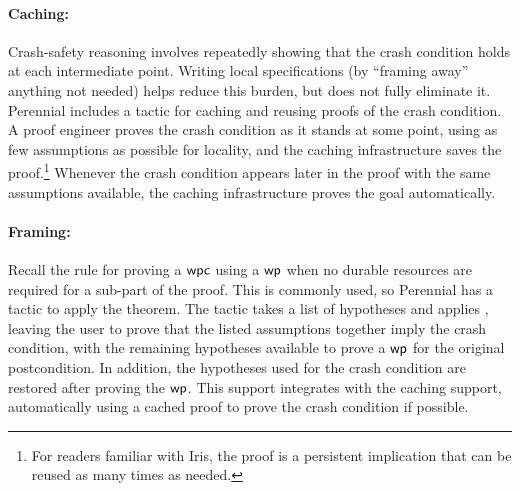 \paragraph{Caching:} Crash-safety reasoning involves repeatedly showing
that the crash condition holds at each intermediate point.
Writing local specifications (by ``framing away'' anything not needed)
helps reduce this burden, but does not fully eliminate it.
Perennial includes a tactic for caching and reusing proofs of the crash condition.
A proof
engineer proves the crash condition as it stands at some point, using
as few assumptions as possible for locality, and the caching infrastructure saves
the proof.\footnote{For readers familiar with Iris, the proof is a persistent
implication that can be reused as many times as needed.}
Whenever the
crash condition appears later in the proof with the same assumptions available,
the caching infrastructure proves the goal automatically.

\paragraph{Framing:} Recall the  rule for
proving a $\textsf{\upshape wpc}$ using a $\textsf{\upshape wp}$ when no durable resources are required for a
sub-part of the proof. This is commonly used, so Perennial has a 
tactic to apply the theorem. The tactic takes a list of hypotheses and applies
, leaving the user to prove that the listed assumptions
together imply the crash condition, with the remaining hypotheses available to
prove a $\textsf{\upshape wp}$ for the original postcondition. In addition, the hypotheses used
for the crash condition are restored after proving the $\textsf{\upshape wp}$. This support
integrates with the caching support, automatically using a cached proof to prove
the crash condition if possible.

